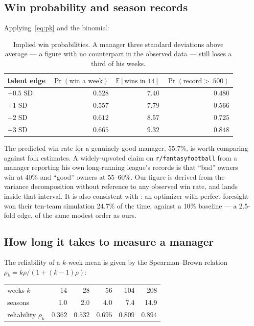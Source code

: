 \documentclass[11pt]{article}
\begin{document}
\subsection{Win probability and season records}

Applying~\eqref{eq:pk} and the binomial:

\begin{table}[h]
\centering\small
\begin{tabular}{lrrr}
\toprule
talent edge & $\Pr(\text{win a week})$ & $\mathbb{E}[\text{wins in 14}]$ & $\Pr(\text{record} > .500)$ \\
\midrule
$+0.5$ SD & $0.528$ & $7.40$ & $0.480$ \\
$+1$ SD   & $0.557$ & $7.79$ & $0.566$ \\
$+2$ SD   & $0.612$ & $8.57$ & $0.725$ \\
$+3$ SD   & $0.665$ & $9.32$ & $0.848$ \\
\bottomrule
\end{tabular}
\caption{Implied win probabilities. A manager three standard deviations above
average --- a figure with no counterpart in the observed data --- still loses a
third of his weeks.}
\label{tab:pwin}
\end{table}

The predicted win rate for a genuinely good manager, $55.7\%$, is worth
comparing against folk estimates. A widely-upvoted claim on
\texttt{r/fantasyfootball} from a manager reporting his own long-running
league's records is that ``bad'' owners win at 40\% and ``good'' owners at
55--60\%. Our figure is derived from the variance decomposition without
reference to any observed win rate, and lands inside that interval. It is also
consistent with \citet{beckersun2016}: an optimizer with perfect foresight won
their ten-team simulation 24.7\% of the time, against a 10\% baseline --- a
2.5-fold edge, of the same modest order as ours.

\subsection{How long it takes to measure a manager}\label{sec:horizon}

The reliability of a $k$-week mean is given by the Spearman--Brown relation
$\rho_k = k\rho / (1 + (k-1)\rho)$:

\begin{center}\small
\begin{tabular}{lrrrrr}
\toprule
weeks $k$ & 14 & 28 & 56 & 104 & 208 \\
seasons & 1.0 & 2.0 & 4.0 & 7.4 & 14.9 \\
reliability $\rho_k$ & $0.362$ & $0.532$ & $0.695$ & $0.809$ & $0.894$ \\
\bottomrule
\end{tabular}
\end{center}
\end{document}
